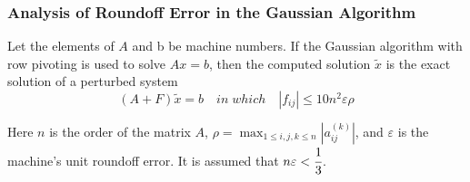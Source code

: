 \documentclass[notheorems,mathserif,table,compress]{beamer}  %
\begin{document}
%
\begin{frame}
\frametitle{Analysis of Roundoff Error in the Gaussian Algorithm}
\begin{theorem}
Let the elements of $A$ and b be machine numbers. If the Gaussian algorithm with row pivoting is used to solve $Ax=b$, then the computed solution $\tilde{x}$ is the exact solution of a perturbed system 
\begin{displaymath}
(A+F)\tilde{x}=b \quad in\; which \quad |f_{ij}|\leq10n^2\varepsilon\rho
\end{displaymath}

Here $n$ is the order of the matrix $A$, $\rho=\max_{1\leq i,j,k\leq n}|a_{ij}^{(k)}|$, and $\varepsilon$ is the machine's unit roundoff error. It is assumed that $n\varepsilon<\cfrac{1}{3}$.
\end{theorem}
\end{frame}
\end{document}
